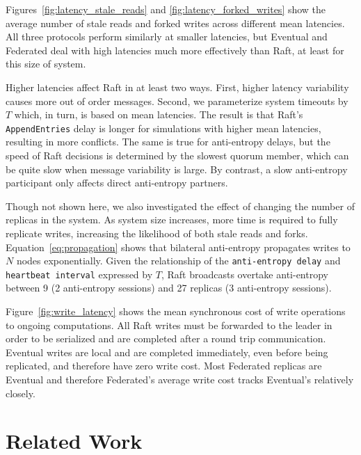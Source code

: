 \documentclass[10pt,conference,letterpaper]{IEEEtran}
\begin{document}
Figures~\ref{fig:latency_stale_reads} and \ref{fig:latency_forked_writes} show
the average number of stale reads and forked writes across different mean
latencies.
All three protocols perform similarly at smaller latencies, but Eventual and
Federated deal with high latencies much more effectively than Raft, at least
for this size of system.

Higher latencies affect Raft in at least two ways.
First, higher latency variability causes more out of order messages.
Second, we parameterize system timeouts by $T$ which, in turn, is based on
mean latencies.
The result is that Raft's \texttt{AppendEntries} delay is longer for
simulations with higher mean latencies, resulting in more conflicts.
The same is true for anti-entropy delays, but the speed of Raft decisions is
determined by the slowest quorum member, which can be quite slow when message
variability is large.
By contrast, a slow anti-entropy participant only affects direct anti-entropy
partners.

Though not shown here, we also investigated the effect of changing the number
of replicas in the system.
As system size increases, more time is required to fully replicate writes,
increasing the likelihood of both stale reads and forks.
Equation~\ref{eq:propagation} shows that bilateral anti-entropy propagates writes
to $N$ nodes exponentially.
Given the relationship of the \texttt{anti-entropy delay} and \texttt{heartbeat interval}
expressed by $T$, Raft broadcasts overtake anti-entropy between 9 (2 anti-entropy
sessions) and 27 replicas (3 anti-entropy sessions).


Figure~\ref{fig:write_latency} shows the mean synchronous cost of write operations to
ongoing computations.
All Raft writes must be forwarded to the leader in order to be serialized and are
completed after a round trip communication.
Eventual writes are local and are completed immediately, even before being replicated,
and therefore have zero write cost.
Most Federated replicas are Eventual and therefore Federated's average write cost tracks
Eventual's relatively closely.

\section{Related Work}
\label{sec:related}
\end{document}
